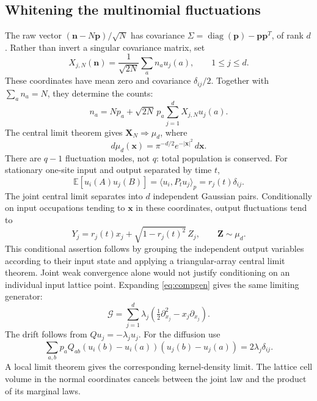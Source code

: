\documentclass[11pt,reqno]{amsart}
\theoremstyle{definition}
\theoremstyle{remark}
\DeclareMathOperator{\diag}{diag}
\begin{document}
\subsection{Whitening the multinomial fluctuations}
The raw vector $(\mathbf n-N\mathbf p)/\sqrt N$ has covariance
$\Sigma=\diag(\mathbf p)-\mathbf p\mathbf p^T$, of rank $d$.
Rather than invert a singular covariance matrix, set
\begin{equation}\label{eq:multiX}
X_{j,N}(\mathbf n)=\frac1{\sqrt{2N}}\sum_an_au_j(a),\qquad 1\le j\le d.
\end{equation}
These coordinates have mean zero and covariance $\delta_{ij}/2$.
Together with $\sum_an_a=N$, they determine the counts:
\begin{equation}\label{eq:invertX}
n_a=Np_a+\sqrt{2N}\,p_a\sum_{j=1}^dX_{j,N}u_j(a).
\end{equation}
The central limit theorem gives $\mathbf X_N\Rightarrow\mu_d$, where
\[
d\mu_d(\mathbf x)=\pi^{-d/2}e^{-|\mathbf x|^2}\,d\mathbf x.
\]
There are $q-1$ fluctuation modes, not $q$: total population is conserved.
For stationary one-site input and output separated by time $t$,
\[
\mathbb E[u_i(A)u_j(B)]=\langle u_i,P_tu_j\rangle_p
=r_j(t)\delta_{ij}.
\]
The joint central limit separates into $d$ independent Gaussian pairs.
Conditionally on input occupations tending to $\mathbf x$ in these
coordinates, output fluctuations tend to
\begin{equation}\label{eq:multiOU}
Y_j=r_j(t)x_j+\sqrt{1-r_j(t)^2}\,Z_j,\qquad \mathbf Z\sim\mu_d.
\end{equation}
This conditional assertion follows by grouping the independent output
variables according to their input state and applying a triangular-array
central limit theorem. Joint weak convergence alone would not justify
conditioning on an individual input lattice point.
Expanding \eqref{eq:compgen} gives the same limiting generator:
\begin{equation}\label{eq:multiG}
\mathcal G=\sum_{j=1}^d\lambda_j
\left(\tfrac12\partial_{x_j}^2-x_j\partial_{x_j}\right).
\end{equation}
The drift follows from $Qu_j=-\lambda_ju_j$. For the diffusion use
\[
\sum_{a,b}p_aQ_{ab}(u_i(b)-u_i(a))(u_j(b)-u_j(a))
=2\lambda_j\delta_{ij}.
\]
A local limit theorem gives the corresponding kernel-density limit.
The lattice cell volume in the normal coordinates cancels between the
joint law and the product of its marginal laws.
\end{document}
